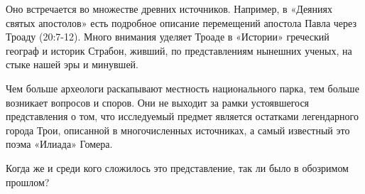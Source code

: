 Оно встречается во множестве древних источников. Например, в «Деяниях святых апостолов» есть подробное описание перемещений апостола Павла через Троаду (20:7-12). Много внимания уделяет Троаде в «Истории» греческий географ и историк Страбон, живший, по представлениям нынешних ученых, на стыке нашей эры и минувшей.

Чем больше археологи раскапывают местность национального парка, тем больше возникает вопросов и споров. Они не выходит за рамки устоявшегося представления о том, что исследуемый предмет является остатками легендарного города Трои, описанной в многочисленных источниках, а самый известный это поэма «Илиада» Гомера.

Когда же и среди кого сложилось это представление, так ли было в обозримом прошлом?
